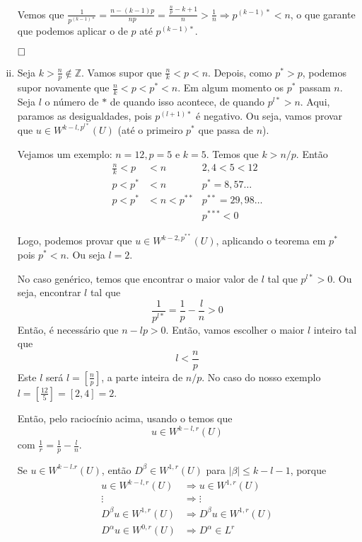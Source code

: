 \documentclass[a4paper, 11pt]{book}
\newcommand{\qed}{$\hfill\square$}
\newcommand{\Z}{\mathbb{Z}}
\begin{document}
\begin{enumerate}[(i)]
	Vemos que $ \frac{1}{p^{(k-1)*}} = \frac{n-(k-1)p}{np} = \frac{\frac{n}{p} - k + 1}{n} > \frac{1}{n} \Rightarrow p^{(k-1)*} < n$, o que garante que podemos aplicar o  de $p$ até $p^{(k-1)*}$.
	
	\qed
	
	
	\item Seja $k > \frac{n}{p} \notin \Z$. Vamos supor que $\frac{n}{k} < p < n$. Depois, como $p^* > p$, podemos supor novamente que $\frac{n}{k} < p < p^* < n$. Em algum momento os $p^*$ passam $n$. Seja $l$ o número de $*$ de quando isso acontece, de quando $p^{l*}>n$. Aqui, paramos as desigualdades, pois $p^{(l+1)*}$ é negativo. Ou seja, vamos provar que $u \in W^{k-l,p^{l*}}(U)$ (até o primeiro $p^*$ que passa de $n$).
	
	Vejamos um exemplo: $n=12, p=5$ e $k=5$. Temos que $k>n/p$. Então \begin{align*}
		\frac{n}{k} < p &< n & 2{,}4 < 5 < 12\\
		p < p^* &< n & p^* = 8{,}57\ldots\\
		p < p^* &< n < p^{**} & p^{**} = 29{,}98\ldots \\
		&& p^{***} < 0 
	\end{align*}

	Logo, podemos provar que $u \in W^{k-2, p^{**}}(U)$, aplicando o teorema em $p^*$ pois $p^* < n$. Ou seja $l=2$.
	
	No caso genérico, temos que encontrar o maior valor de $l$ tal que $p^{l*}>0$. Ou seja, encontrar $l$ tal que \[ \frac{1}{p^{l*}} = \frac{1}{p} - \frac{l}{n} > 0  \] Então, é necessário que $n - lp >0$. Então, vamos escolher o maior $l$ inteiro tal que \[ l < \frac{n}{p} \] Este $l$ será $l= \left[\frac{n}{p}\right]$, a parte inteira de $n/p$. No caso do nosso exemplo $l=\left[\frac{12}{5}\right] = \left[2{,}4\right] = 2$.
	
	Então, pelo raciocínio acima, usando o  temos que \[  u \in W^{k-l,r}(U)   \]com $ \frac{1}{r} = \frac{1}{p} - \frac{l}{n} $.
	
	Se $u \in W^{k-l. r}(U)$, então $D^\beta \in W^{1,r}(U)$ para $|\beta|\leq k-l-1$, porque \begin{align*}
		u \in W^{k-l,r}(U) &\Rightarrow u \in W^{1,r}(U)\\
		\vdots & \Rightarrow \vdots \\
		D^\beta u \in W^{1,r}(U) &\Rightarrow D^\beta u \in W^{1,r}(U) \\
		D^\alpha u \in W^{0,r}({U}) &\Rightarrow D^\alpha \in L^r 
	\end{align*}


\end{enumerate}
\end{document}
